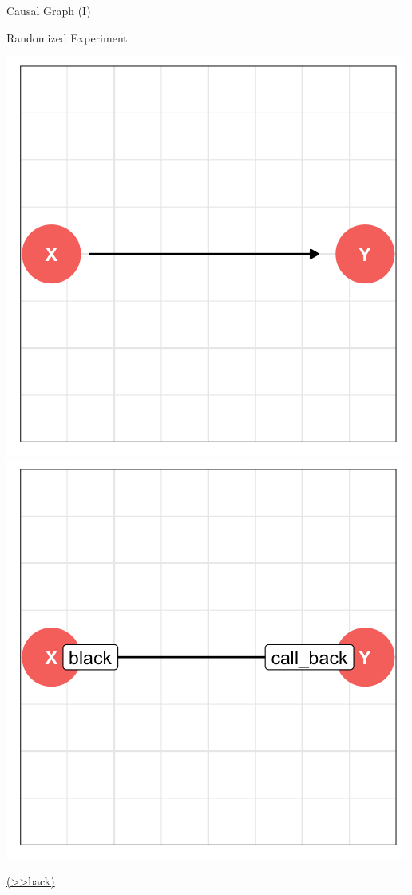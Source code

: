 \documentclass[
  10pt,
  ignorenonframetext,
]{beamer}
\begin{document}
\begin{frame}{Causal Graph (I)}
\protect\hypertarget{RCT}{}
\begin{block}{Randomized Experiment}
\protect\hypertarget{randomized-experiment}{}
\begin{center}\includegraphics[width=0.4\linewidth,height=0.54\textheight]{pictures/RCTsetting1} \includegraphics[width=0.4\linewidth,height=0.54\textheight]{pictures/RCTsetting2} \end{center}

\footnotesize\protect\hyperlink{RCTQ}{(\textgreater\textgreater back)}
\normalsize
\end{block}
\end{frame}
\end{document}
